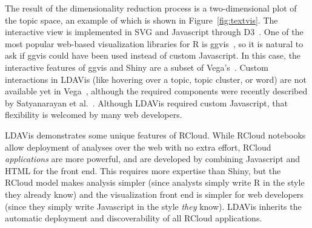 The result of the dimensionality reduction process is a
two-dimensional plot of the topic space, an example of which is shown in
Figure~\ref{fig:textvis}. The interactive view is implemented in SVG
and Javascript through D3~\cite{Bostock:2011:DDD}. One of the most
popular web-based visualization libraries for R is ggvis~\cite{ggvis},
so it is natural to ask if ggvis could have been used instead of
custom Javascript. In this case, the interactive features of ggvis
and Shiny are a subset of Vega's~\cite{vega}.
Custom interactions in LDAVis (like hovering over a topic,
topic cluster, or word) are not available yet in Vega~\cite{vega},
although the required components were recently described by Satyanarayan et
al.~\cite{Satyanarayan:2014:DID}.
Although LDAVis required custom Javascript, that flexibility is welcomed
by many web developers.

LDAVis demonstrates some unique features of RCloud.
While RCloud notebooks allow deployment of analyses over
the web with no extra effort, RCloud \emph{applications} are more
powerful, and are developed by combining Javascript and HTML
for the front end. This requires more expertise than Shiny, but
the RCloud model makes analysis simpler (since analysts
simply write R in the style they already know)
and the visualization front end is simpler for web
developers (since they simply write Javascript in
the style \emph{they} know).
LDAVis inherits the automatic deployment and discoverability
of all RCloud applications.

%
